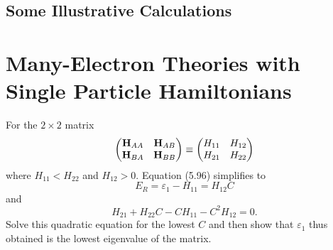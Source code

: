 \documentclass[a4paper]{book}
\newcounter{exercise}[chapter]
\newcommand{\HH}{{\bf H}}
\begin{document}
	\subsection{Some Illustrative Calculations}
	
	\section{Many-Electron Theories with Single Particle Hamiltonians}	
	
	\begin{exercise}
	For the $2 \times 2$ matrix
	\[
		\begin{pmatrix}
			\HH_{AA} & \HH_{AB} \\ \HH_{BA} & \HH_{BB} 
		\end{pmatrix} \equiv \begin{pmatrix}
		H_{11} & H_{12} \\ H_{21} & H_{22}
		\end{pmatrix}
	\]
	where $H_{11} < H_{22}$ and $H_{12} > 0$. Equation (5.96) simplifies to
	\[
		E_R = \varepsilon_1 - H_{11} = H_{12} C
	\]
	and
	\[
		H_{21} + H_{22} C - C H_{11} - C^2 H_{12} = 0.
	\]
	Solve this quadratic equation for the lowest $C$ and then show that $\varepsilon_1$ thus obtained is the lowest eigenvalue of the matrix.
	\end{exercise}
	
\end{document}
